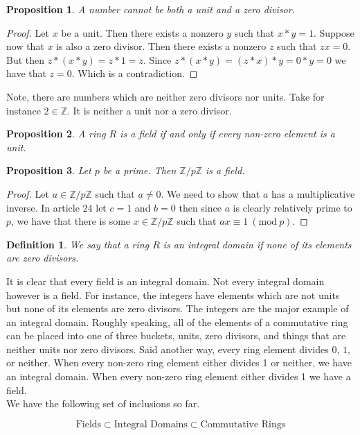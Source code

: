 \documentclass{article}
\theoremstyle{problemstyle}
\newtheorem{proposition}{Proposition}
\newtheorem{definition}{Definition}
\newcommand{\Mod}[1]{\ (\mathrm{mod}\ #1)}
\begin{document}
\setcounter{proposition}{0}

\begin{proposition}
A number cannot be both a unit and a zero divisor.  
\end{proposition}

\begin{proof}
Let $x$ be a unit. Then there exists a nonzero $y$ such that $x*y = 1$. Suppose now that $x$ is also a zero divisor. Then there exists a nonzero $z$ such that $zx = 0$. But then $z*(x*y) = z*1 = z$. Since  $z*(x*y) = (z*x)*y = 0*y = 0$ we have that $z = 0$. Which is a contradiction.  
\end{proof}

Note, there are numbers which are neither zero divisors nor units. Take for instance $2 \in \mathbb{Z}$. It is neither a unit nor a zero divisor. 

\begin{proposition}
A ring $R$ is a field if and only if every non-zero element is a unit. 
\end{proposition}

\begin{proposition}
Let $p$ be a prime. Then $\mathbb{Z}/p\mathbb{Z}$ is a field. 
\end{proposition}

\begin{proof}
Let $a \in \mathbb{Z}/p\mathbb{Z}$ such that $a \neq 0$. We need to show that $a$ has a multiplicative inverse. In article $24$ let $c = 1$ and $b = 0$ then since $a$ is clearly relatively prime to $p$, we have that there is some $x \in \mathbb{Z}/p\mathbb{Z}$ such that $ax \equiv 1 \Mod{p}$.
\end{proof}

\begin{definition}
We say that a ring $R$ is an integral domain if none of its elements are zero divisors. 
\end{definition}

It is clear that every field is an integral domain. Not every integral domain however is a field. For instance, the integers have elements which are not units but none of its elements are zero divisors. The integers are the major example of an integral domain. Roughly speaking, all of the elements of a commutative ring can be placed into one of three buckets, units, zero divisors, and things that are neither units nor zero divisors. Said another way, every ring element divides $0$, $1$, or neither. When every non-zero ring element either divides 1 or neither, we have an integral domain. When every non-zero ring element either divides 1 we have a field. \\

We have the following set of inclusions so far. 

$$\text{Fields} \subset \text{Integral Domains} \subset \text{Commutative Rings}$$
\end{document}
